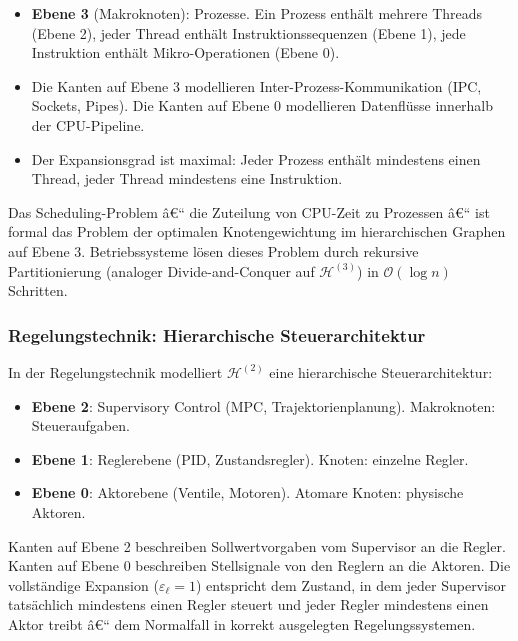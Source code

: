 ﻿\documentclass[12pt,a4paper,twoside]{article}
\theoremstyle{definition}
\theoremstyle{plain}
\theoremstyle{remark}
\begin{document}
\begin{itemize}
	\item \textbf{Ebene 3} (Makroknoten): Prozesse.  Ein Prozess
	enthält mehrere Threads (Ebene 2), jeder Thread enthält
	Instruktionssequenzen (Ebene 1), jede Instruktion enthält
	Mikro-Operationen (Ebene 0).
	\item Die Kanten auf Ebene 3 modellieren Inter-Prozess-Kommunikation
	(IPC, Sockets, Pipes).  Die Kanten auf Ebene 0 modellieren
	Datenflüsse innerhalb der CPU-Pipeline.
	\item Der Expansionsgrad ist maximal: Jeder Prozess enthält
	mindestens einen Thread, jeder Thread mindestens eine
	Instruktion.
\end{itemize}

Das Scheduling-Problem â€“ die Zuteilung von CPU-Zeit zu Prozessen â€“
ist formal das Problem der optimalen Knotengewichtung im
hierarchischen Graphen auf Ebene 3.  Betriebssysteme lösen dieses
Problem durch rekursive Partitionierung (analoger Divide-and-Conquer
auf $\mathcal{H}^{(3)}$) in $\mathcal{O}(\log n)$ Schritten.

\subsubsection{Regelungstechnik: Hierarchische Steuerarchitektur}

In der Regelungstechnik modelliert $\mathcal{H}^{(2)}$ eine
hierarchische Steuerarchitektur:

\begin{itemize}
	\item \textbf{Ebene 2}: Supervisory Control (MPC, Trajektorien\-planung).
	Makroknoten: Steueraufgaben.
	\item \textbf{Ebene 1}: Reglerebene (PID, Zustandsregler).
	Knoten: einzelne Regler.
	\item \textbf{Ebene 0}: Aktorebene (Ventile, Motoren).
	Atomare Knoten: physische Aktoren.
\end{itemize}

Kanten auf Ebene 2 beschreiben Sollwertvorgaben vom Supervisor an
die Regler.  Kanten auf Ebene 0 beschreiben Stellsignale von den
Reglern an die Aktoren.  Die vollständige Expansion
($\varepsilon_\ell = 1$) entspricht dem Zustand, in dem jeder
Supervisor tatsächlich mindestens einen Regler steuert und jeder
Regler mindestens einen Aktor treibt â€“ dem Normalfall in korrekt
ausgelegten Regelungssystemen.

\end{document}
